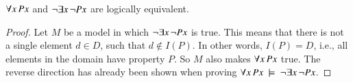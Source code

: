 \documentclass[nobib,nofonts]{tufte-handout}
\begin{document}
\begin{claim}
  \label{claim:equivalence-universal-existential}
  $\forall x \thinspace Px$ and $\neg \exists x \thinspace \neg Px$ are logically equivalent.
\end{claim}

\begin{proof}
  Let $M$ be a model in which $\neg \exists x \thinspace \neg Px$ is true.
  This means that there is not a single element $d \in D$, such that $d \not \in I(P)$.
  In other words, $I(P) = D$, i.e., all elements in the domain have property $P$.
  So $M$ also makes $\forall x \thinspace Px$ true.
  The reverse direction has already been shown when proving $\forall x \thinspace Px \ \models \ \neg \exists x \thinspace \neg Px$.
\end{proof}

\newpage
\end{document}
